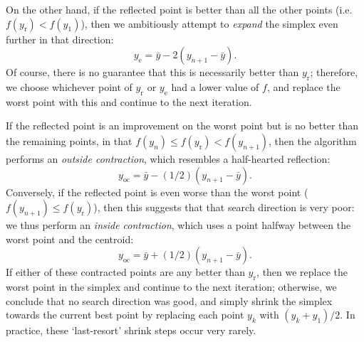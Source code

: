 On the other hand, if the reflected point is better than all the other points (i.e.\ $f(y_\text{r}) < f(y_1)$), then we ambitiously attempt to \textit{expand} the simplex even further in that direction:
\begin{equation}
    \label{eq:nm_expand}
    y_\text{e} = \bar{y} - 2(y_{n+1} - \bar{y}).
\end{equation}
Of course, there is no guarantee that this is necessarily better than $y_\text{r}$; therefore, we choose whichever point of $y_\text{r}$ or $y_\text{e}$ had a lower value of $f$, and replace the worst point with this and continue to the next iteration.

If the reflected point is an improvement on the worst point but is no better than the remaining points, in that $f(y_n) \leq f(y_\text{r}) < f(y_{n+1})$, then the algorithm performs an \textit{outside contraction}, which resembles a half-hearted reflection:
\begin{equation}
    \label{eq:nm_outside_contract}
    y_\text{oc} = \bar{y} - (1/2)(y_{n+1} - \bar{y}).
\end{equation}
Conversely, if the reflected point is even worse than the worst point ($f(y_{n+1}) \leq f(y_\text{r})$), then this suggests that that search direction is very poor: we thus perform an \textit{inside contraction}, which uses a point halfway between the worst point and the centroid:
\begin{equation}
    \label{eq:nm_inside_contract}
    y_\text{oc} = \bar{y} + (1/2)(y_{n+1} - \bar{y}).
\end{equation}
If either of these contracted points are any better than $y_\text{r}$, then we replace the worst point in the simplex and continue to the next iteration; otherwise, we conclude that no search direction was good, and simply shrink the simplex towards the current best point by replacing each point $y_k$ with $(y_k + y_1)/2$.
In practice, these `last-resort' shrink steps occur very rarely.


